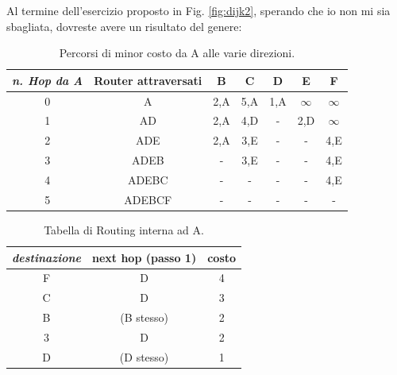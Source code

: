 \noindent Al termine dell'esercizio proposto in Fig. \ref{fig:dijk2}, sperando che io non mi sia sbagliata, dovreste avere un risultato del genere:

\begin{table}[ht]
\centering
\begin{tabular}{|c|c|c|c|c|c|c|}
\hline
\textit{n. Hop da A} & Router attraversati & B   & C   & D   & E        & F        \\ \hline
0                    & A                   & 2,A & 5,A & 1,A & $\infty$ & $\infty$ \\
1                    & AD                  & 2,A & 4,D & -   & 2,D      & $\infty$ \\
2                    & ADE                 & 2,A & 3,E & -   & -        & 4,E      \\
3                    & ADEB                & -   & 3,E & -   & -        & 4,E      \\
4                    & ADEBC               & -   & -   & -   & -        & 4,E      \\
5                    & ADEBCF              & -   & -   & -   & -        & -        \\ \hline
\end{tabular}
\caption{Percorsi di minor costo da A alle varie direzioni.}
\end{table}

\begin{table}[ht]
\centering
\begin{tabular}{|c|c|c|}
\hline
\textit{destinazione} & next hop (passo 1) & costo \\ \hline
F                     & D                  & 4     \\
C                     & D                  & 3     \\
B                     & (B stesso)         & 2     \\
3                     & D                  & 2     \\
D                     & (D stesso)         & 1     \\ \hline
\end{tabular}
\caption{Tabella di Routing interna ad A.}
\end{table}


